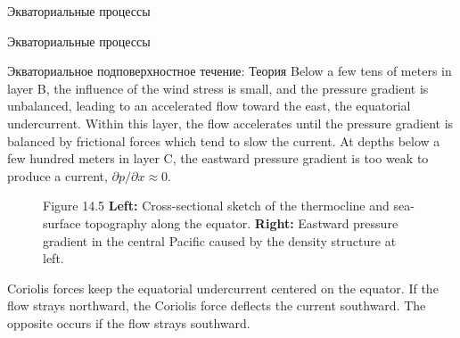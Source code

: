 \begin{chapter}{Экваториальные процессы}
\begin{section}{Экваториальные процессы}
\begin{paragraph}{Экваториальное подповерхностное течение: Теория}
Below a few tens of meters in layer B, the influence of the wind
stress is small, and the pressure gradient is unbalanced, leading to
an accelerated flow toward the east, the equatorial
undercurrent. Within this layer, the flow accelerates until the
pressure gradient is balanced by frictional forces which tend to slow
the current. At depths below a few hundred meters in layer C, the
eastward pressure gradient is too weak to produce a current, 
$\partial p / \partial x \approx 0$.
% 

\begin{figure}[t!]
\caption{Figure 14.5 \textbf{Left:} Cross-sectional sketch of
the thermocline and sea-surface
topography along the equator.  \textbf{Right:} Eastward pressure
gradient in the central Pacific caused by the density structure at
left.}
\label{fig:equatorsketch}
\end{figure}
%

Coriolis forces keep the equatorial undercurrent centered on the
equator. If the flow strays northward, the Coriolis force deflects the
current southward.  The opposite occurs if the flow strays southward.
%
\end{paragraph}
\end{section}


\end{chapter}

